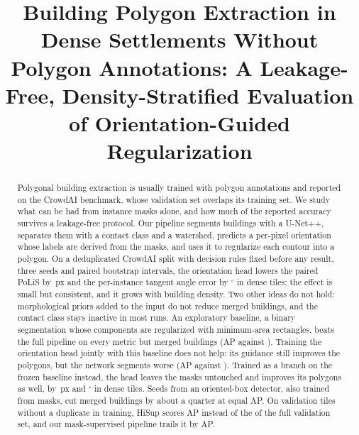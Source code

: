 \documentclass[conference]{IEEEtran}
\newcommand{\papertitle}{Building Polygon Extraction in Dense Settlements Without Polygon Annotations:
A Leakage-Free, Density-Stratified Evaluation of Orientation-Guided Regularization}
\begin{document}
\title{\papertitle}

\author{
}

\maketitle

\begin{abstract}
Polygonal building extraction is usually trained with polygon annotations and reported on the CrowdAI benchmark, whose
validation set overlaps its training set. We study what can be had from instance masks alone, and how much of the
reported accuracy survives a leakage-free protocol. Our pipeline segments buildings with a U-Net++, separates them with
a contact class and a watershed, predicts a per-pixel orientation whose labels are derived from the masks, and uses it
to regularize each contour into a polygon. On a deduplicated CrowdAI split with decision rules fixed before any result,
three seeds and paired bootstrap intervals, the orientation head lowers the paired PoLiS by \NNoneTotalPolisAbs\,px and
the per-instance tangent angle error by \NNoneTotalMtaAbs$^\circ$ in dense tiles; the effect is small but consistent, and
it grows with building density. Two other ideas do not hold: morphological priors added to the input do not reduce
merged buildings, and the contact class stays inactive in most runs. An exploratory baseline, a binary segmentation
whose components are regularized with minimum-area rectangles, beats the full pipeline on every metric but merged
buildings (AP \NApBthreem{} against \NApFull). Training the orientation head jointly with this baseline does not
help: its guidance still improves the polygons, but the network segments worse (AP \NApBthreet{} against
\NApBthreem). Trained as a branch on the frozen baseline instead, the head leaves the masks untouched and improves its
polygons as well, by \NFrozThetaTotalPolisAbs\,px and \NFrozThetaTotalMtaAbs$^\circ$ in dense tiles. Seeds from an oriented-box detector, also trained from masks, cut merged buildings by about a quarter at
equal AP. On \NTilesClean{} validation tiles without a duplicate in training, HiSup
scores \NCleanApHisup{} AP instead of the \NLeakyApHisup{} of the full validation set, and our mask-supervised
pipeline trails it by \NCleanDeltaApAbs{} AP.
\end{abstract}
\end{document}
